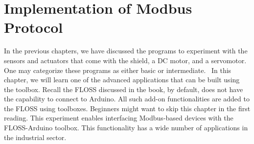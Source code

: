 \chapter {Implementation of Modbus Protocol}
\thispagestyle{empty}
\label{modbus}

\newcommand{\LocMODfig}{\Origin/user-code/modbus/figures}
\newcommand{\LocMODscicode}{\Origin/user-code/modbus/scilab}
\newcommand{\LocMODscibrief}[1]{{\tt \seqsplit{%
        Origin/user-code/modbus/scilab}}, see \fnrefp{fn:file-loc}}
\newcommand{\LocMODardcode}{\Origin/user-code/modbus/arduino}
\newcommand{\LocMODardbrief}[1]{{\tt \seqsplit{%
        Origin/user-code/modbus/arduino}}, see \fnrefp{fn:file-loc}}

\newcommand{\LocMODpycode}{\Origin/user-code/modbus/python}
\newcommand{\LocMODpybrief}[1]{{\tt \seqsplit{%
        Origin/user-code/modbus/python}}, see \fnrefp{fn:file-loc}}


\newcommand{\LocMODjuliacode}{\Origin/user-code/modbus/julia}
\newcommand{\LocMODjuliabrief}[1]{{\tt \seqsplit{%
        Origin/user-code/modbus/julia}}, see \fnrefp{fn:file-loc}}




\newcommand{\LocMODOpenModelicacode}{\Origin/user-code/modbus/OpenModelica}
\newcommand{\LocMODOpenModelicabrief}[1]{{\tt \seqsplit{%
        Origin/user-code/modbus/OpenModelica}}, see \fnrefp{fn:file-loc}}


In the previous chapters, we have discussed the programs to experiment with the sensors and actuators that come with the shield, a DC motor, and a servomotor. One may categorize these programs as either basic or intermediate.  In this chapter, we will learn one of the advanced applications that can be built using the toolbox. Recall the FLOSS discussed in the book, by default, does not have the capability to connect to Arduino. All such add-on functionalities are added to the FLOSS using toolboxes. Beginners might want to skip this chapter in the first reading. This experiment enables interfacing Modbus-based devices with the FLOSS-Arduino toolbox. This functionality has a wide number of applications in the industrial sector. 


